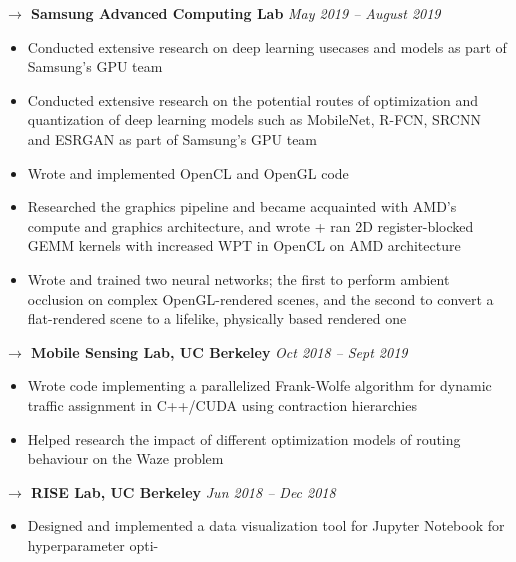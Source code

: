 \documentclass{res}
\begin{document}
\begin{resume}
		\vspace{-10pt}
		{\bf $\rightarrow$ Samsung Advanced Computing Lab} \hfill \emph{May 2019 -- August 2019} \\
        \vspace{-10pt}
        \begin{itemize}
            \item Conducted extensive research on deep learning usecases and models as part of Samsung's GPU team
            \item Conducted extensive research on the potential routes of optimization and quantization of deep learning models such as MobileNet, R-FCN, SRCNN and ESRGAN as part of Samsung's GPU team
            \item Wrote and implemented OpenCL and OpenGL code 
            \item Researched the graphics pipeline and became acquainted with AMD's compute and graphics architecture, and wrote + ran 2D
                register-blocked GEMM kernels with increased WPT in OpenCL on AMD architecture
            \item Wrote and trained two neural networks; the first to perform ambient occlusion on complex OpenGL-rendered scenes, and the second to convert a flat-rendered scene to a lifelike, physically based rendered one  
        \end{itemize}
		\vspace{-10pt}
		{\bf $\rightarrow$ Mobile Sensing Lab, UC Berkeley} \hfill \emph{Oct 2018 -- Sept 2019} \\
        \vspace{-10pt}
        \begin{itemize}
            \item Wrote code implementing a parallelized Frank-Wolfe algorithm for dynamic traffic assignment in C++/CUDA using contraction
                hierarchies
            \item Helped research the impact of different optimization models of routing behaviour on the Waze problem
        \end{itemize}
		\vspace{-10pt}
		{\bf $\rightarrow$ RISE Lab, UC Berkeley} \hfill \emph{Jun 2018 -- Dec 2018} \\
        \vspace{-10pt}
        \begin{itemize}
            \item Designed and implemented a data visualization tool for Jupyter Notebook for hyperparameter opti-

\end{itemize}
\end{resume}
\end{document}

